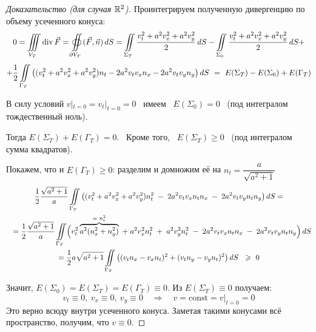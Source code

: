 \documentclass[../main.tex]{subfiles}
\begin{document}
\begin{proof}[Доказательство (для случая $\mathbb{R}^2$)]
Проинтегрируем полученную дивергенцию по объему усеченного конуса:
\begin{multline*}
  0 = \iiint\limits_{V_T}\operatorname{div}\vec{F} =
  \oiint\limits_{\partial V_T}(\vec{F},\vec{n})\, dS 
  =\iint\limits_{\Sigma_T}\frac{v^2_t+a^2v^2_x+a^2v^2_y}{2}\, dS - \iint\limits_{\Sigma_0}\frac{v^2_t+a^2v^2_x+a^2v^2_y}{2}\, dS + \\[0.4em]
  + \frac{1}{2}\iint\limits_{\Gamma_T}\left((v^2_t+a^2v^2_x+a^2v^2_y)n_t-2a^2v_tv_xn_x - 2a^2v_tv_yn_y\right)dS
  \ = \ E(\Sigma_T) - E(\Sigma_0) + E(\Gamma_T)
\end{multline*}

В силу условий $ v|_{t=0} = v_t|_{t=0} = 0$ \ имеем \ $ E(\Sigma_0)=0 $ \ (под интегралом тождественный ноль).

Тогда $ E(\Sigma_T)+E(\Gamma_T)=0 $. \ 
Кроме того, \ $ E(\Sigma_T)\geq 0 $ \ (под интегралом сумма квадратов).
\vspace{0.5em}

Покажем, что и $ E(\Gamma_T)\geq 0 $: разделим и домножим её на $ n_t=\dfrac{a}{\sqrt{a^2+1}} $
\begin{multline*}
  \frac{1}{2}\frac{\sqrt{a^2+1}}{a}\iint\limits_{\Gamma_T}\brs{(v^2_t+a^2v^2_x+a^2v^2_y)n^2_t \; - \; 2a^2v_tv_xn_tn_x \; - \; 2a^2v_tv_yn_tn_y} dS = \\ \shoveleft{
  =\frac{1}{2}\frac{\sqrt{a^2+1}}{a}\iint\limits_{\Gamma_T} \Bigl( v^2_t \overbrace{a^2(n^2_x + n^2_y)}^\text{= $n_t^2$}\; + \; a^2v^2_xn^2_t \; + \; a^2v^2_yn^2_t\; - \; 2a^2v_tv_xn_tn_x \; - \; 2a^2 v_t v_y n_t n_y \Bigr)\, dS }\\
  = \frac{1}{2} a \sqrt{a^2+1} \iint\limits_{\Gamma_T} \brs{(v_tn_x -v_xn_t)^2+(v_tn_y-v_yn_t)^2} dS \;\ \geq\ 0  
\end{multline*}

Значит,\; $ E(\Sigma_0)=E(\Sigma_T)=E(\Gamma_T)\equiv 0.$
\; Из $ E(\Sigma_T)\equiv 0 $ получаем: 
$$ v_t\equiv 0,\ v_x\equiv 0,\ v_y\equiv 0 \quad \Rightarrow \quad v = \text{const} = v|_{t=0} = 0 
$$
Это верно всюду внутри усеченного конуса.
Заметая такими конусами всё пространство, получим, что $ v \equiv 0 $.
\end{proof}
\end{document}
